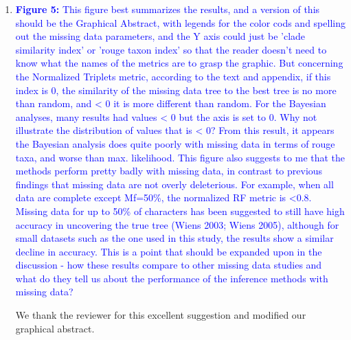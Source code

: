 \documentclass[12pt,letterpaper]{article}
\begin{document}
\begin{enumerate}
\item{\textcolor{blue}{\textbf{Figure 5:} This figure best summarizes the results, and a version of this should be the Graphical Abstract, with legends for the color cods and spelling out the missing data parameters, and the Y axis could just be 'clade similarity index' or 'rouge taxon index' so that the reader doesn't need to know what the names of the metrics are to grasp the graphic. But concerning the Normalized Triplets metric, according to the text and appendix, if this index is 0, the similarity of the missing data tree to the best tree is no more than random, and < 0 it is more different than random. For the Bayesian analyses, many results had values < 0 but the axis is set to 0. Why not illustrate the distribution of values that is < 0? From this result, it appears the Bayesian analysis does quite poorly with missing data in terms of rouge taxa, and worse than max. likelihood. This figure also suggests to me that the methods perform pretty badly with missing data, in contrast to previous findings that missing data are not overly deleterious. For example, when all data are complete except Mf=50\%, the normalized RF metric is <0.8. Missing data for up to 50\% of characters has been suggested to still have high accuracy in uncovering the true tree (Wiens 2003; Wiens 2005), although for small datasets such as the one used in this study, the results show a similar decline in accuracy. This is a point that should be expanded upon in the discussion - how these results compare to other missing data studies and what do they tell us about the performance of the inference methods with missing data?}}

We thank the reviewer for this excellent suggestion and modified our graphical abstract.


\end{enumerate}
\end{document}
